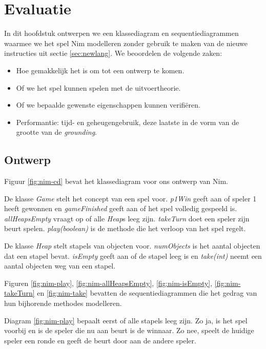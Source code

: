 \chapter{Evaluatie}\label{sec:evaluatie}

In dit hoofdstuk ontwerpen we een klassediagram en sequentiediagrammen waarmee we het spel Nim modelleren zonder gebruik te maken van de nieuwe instructies uit sectie \ref{sec:newlang}. We beoordelen de volgende zaken:

\begin{itemize}
	\item Hoe gemakkelijk het is om tot een ontwerp te komen.
	\item Of we het spel kunnen spelen met de uitvoertheorie.
	\item Of we bepaalde gewenste eigenschappen kunnen verifi\"eren.
	\item Performantie: tijd- en geheugengebruik, deze laatste in de vorm van de grootte van de \textit{grounding}\cite{DeCatBroes2014PLaa}.
\end{itemize}

\section{Ontwerp}

Figuur \ref{fig:nim-cd} bevat het klassediagram voor ons ontwerp van Nim.

De klasse \textit{Game} stelt het concept van een spel voor. \textit{p1Win} geeft aan of speler 1 heeft gewonnen en \textit{gameFinished} geeft aan of het spel volledig gespeeld is. \textit{allHeapsEmpty} vraagt op of alle \textit{Heap}s leeg zijn. \textit{takeTurn} doet een speler zijn beurt spelen. \textit{play(boolean)} is de methode die het verloop van het spel regelt.

De klasse \textit{Heap} stelt stapels van objecten voor. \textit{numObjects} is het aantal objecten dat een stapel bevat. \textit{isEmpty} geeft aan of de stapel leeg is en \textit{take(int)} neemt een aantal objecten weg van een stapel.

Figuren \ref{fig:nim-play}, \ref{fig:nim-allHeapsEmpty}, \ref{fig:nim-isEmpty}, \ref{fig:nim-takeTurn} en \ref{fig:nim-take} bevatten de sequentiediagrammen die het gedrag van hun bijhorende methodes modelleren.

Diagram \ref{fig:nim-play} bepaalt eerst of alle stapels leeg zijn. Zo ja, is het spel voorbij en is de speler die nu aan beurt is de winnaar. Zo nee, speelt de huidige speler een ronde en geeft de beurt door aan de andere speler.

